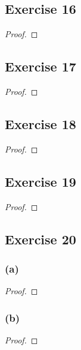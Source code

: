 \documentclass[14pt]{extarticle}
\begin{document}
\subsection{Exercise 16}

\begin{proof}

\end{proof}

\subsection{Exercise 17}

\begin{proof}

\end{proof}

\subsection{Exercise 18}

\begin{proof}

\end{proof}

\subsection{Exercise 19}

\begin{proof}

\end{proof}

\subsection{Exercise 20}

\subsubsection{(a)}

\begin{proof}

\end{proof}

\subsubsection{(b)}

\begin{proof}

\end{proof}
\end{document}
